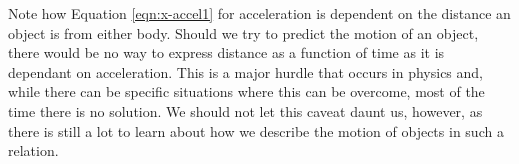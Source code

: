 Note how Equation \eqref{eqn:x-accel1} for acceleration is dependent on the distance an object is from either body.
Should we try to predict the motion of an object, there would be no way to express distance as a function of time as it is dependant on acceleration.
This is a major hurdle that occurs in physics and, while there can be specific situations where this can be overcome, most of the time there is no solution.
We should not let this caveat daunt us, however, as there is still a lot to learn about how we describe the motion of objects in such a relation.

\newpage
